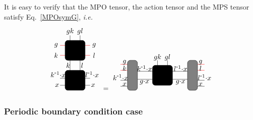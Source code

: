 \documentclass[a4paper,twocolumn,11pt,accepted=2023-02-10]{quantumarticle}
\newcommand{\myinv}[1]{#1^{\scalebox{0.9}[1.0]{-}1}}
\begin{document}
It is easy to verify that the MPO tensor, the action tensor and the MPS tensor satisfy Eq.\ \eqref{MPOsymG}, {\it i.e.}
$$
\begin{tikzpicture}
\begin{scope}[yshift = 1.5cm]
\draw[red] (-0.75, 0.25) -- (0.75, 0.25);
\node at (-0.95, 0.25) {$g$};
\node at (0.95, 0.25) {$g$};
\draw[red] (-0.75, -0.25) -- (0.75, -0.25);
\node at (-0.95, -0.25) {$k$};
\node at (0.95, -0.25) {$l$};
\draw (-0.25, 0.75) -- (-0.25, -0.75);
\draw (0.25, 0.75) -- (0.25, -0.75);
\node at (-0.25, 0.95) {$gk$};
\node at (0.25, 0.95) {$gl$};
\draw[rounded corners, fill= black] (-0.5,-0.5) rectangle (0.5,0.5);
\end{scope}
\draw (-0.75, 0.1) -- (0.75, 0.1);
\node at (-0.85, 0.3) {$\myinv{k}{\cdot} x$};
\node at (0.85, 0.3) {$\myinv{l}{\cdot} x$};
\draw (-0.75, -0.25) -- (0.75, -0.25);
\node at (-0.9, -0.25) {$x$};
\node at (0.9, -0.25) {$x$};
\draw (-0.25, 0.75) -- (-0.25, 0);
\draw (0.25, 0.75) -- (0.25, 0);
\node at (-0.35, 0.75) {${k}$};
\node at (0.35, 0.75) {${l}$};
\draw[rounded corners, fill= black] (-0.5,-0.5) rectangle (0.5,0.5);
\end{tikzpicture}
=
\begin{tikzpicture}
\draw (-1.25,0.2)-- (1.25,0.2);
\draw (-1.25,-0.2)-- (1.25,-0.2);
\draw[red] (-1.75,0.55)-- (-2.1,0.55);
\draw[red] (-1.75,0.25)-- (-2.1,0.25);
\draw[] (-1.75,-0.55)-- (-2.1,-0.55);
\draw[] (-1.75,-0.25)-- (-2.1,-0.25);
%
\draw[red] (1.75,0.55)-- (2.1,0.55);
\draw[red] (1.75,0.25)-- (2.1,0.25);
\draw[] (1.75,-0.55)-- (2.1,-0.55);
\draw[] (1.75,-0.25)-- (2.1,-0.25);
\node at (1.9, 0.65) {$g$};
\node at (1.9, 0.35) {$l$};
\node at (2.1, -0.1) {$\myinv{l}{\cdot} x$};
\node at (1.9, -0.45) {$x$};
\node at (-1.9, 0.65) {$g$};
\node at (-1.9, 0.35) {$k$};
\node at (-2.1, -0.1) {$\myinv{k}{\cdot} x$};
\node at (-1.9, -0.45) {$x$};

\draw[rounded corners, fill= black] (-0.5,-0.5) rectangle (0.5,0.5);
\draw[rounded corners, fill=gray ] (-1.75,-0.75) rectangle (-1.25,0.75);
\draw[rounded corners, fill=gray ] (1.75,-0.75) rectangle (1.25,0.75);
\node at (-0.9, 0.35) {$\myinv{k}{\cdot} x$};
\node at (0.9, 0.35) {$\myinv{l}{\cdot} x$};
\node at (-0.9, -0.35) {$g{\cdot} x$};
\node at (0.9, -0.35) {$g{\cdot} x$};
\draw (-0.25, 0.75) -- (-0.25, 0);
\draw (0.25, 0.75) -- (0.25, 0);
\node at (-0.25, 0.9) {$gk$};
\node at (0.25, 0.9) {$g{l}$};
\end{tikzpicture}
$$

\subsubsection{Periodic boundary condition case}
\end{document}
